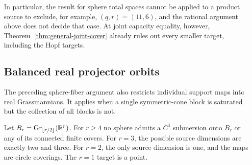 In particular, the result for sphere total spaces cannot be applied to a
product source to exclude, for example, $(q,r)=(11,6)$, and the rational
argument above does not decide that case. At joint capacity equality,
however, Theorem~\ref{thm:general-joint-cover} already rules out every
smaller target, including the Hopf targets.

\subsection{Balanced real projector orbits}
The preceding sphere-fiber argument also restricts individual support
maps into real Grassmannians. It applies when a single symmetric-cone
block is saturated but the collection of all blocks is not.

\begin{proposition}
\label{prop:balanced-real-submersion}
Let $B_r=\operatorname{Gr}_{\lfloor r/2\rfloor}(\mathbb R^r)$.
For $r\geq4$ no sphere admits a $C^1$ submersion onto $B_r$ or any of
its connected finite covers. For $r=3$, the possible source dimensions
are exactly two and three. For $r=2$, the only source dimension is one,
and the maps are circle coverings. The $r=1$ target is a point.
\end{proposition}

